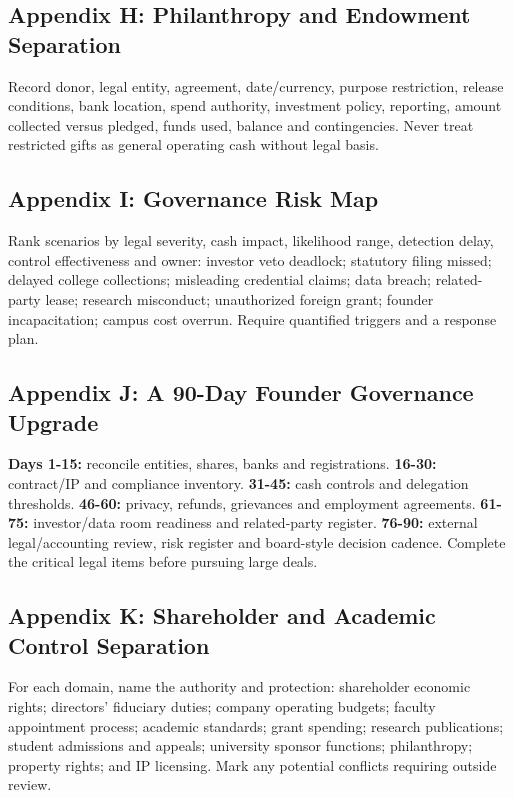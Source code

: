 \subsection{Appendix H: Philanthropy and Endowment Separation}

Record donor, legal entity, agreement, date/currency, purpose restriction, release conditions, bank location, spend authority, investment policy, reporting, amount collected versus pledged, funds used, balance and contingencies. Never treat restricted gifts as general operating cash without legal basis.

\subsection{Appendix I: Governance Risk Map}

Rank scenarios by legal severity, cash impact, likelihood range, detection delay, control effectiveness and owner: investor veto deadlock; statutory filing missed; delayed college collections; misleading credential claims; data breach; related-party lease; research misconduct; unauthorized foreign grant; founder incapacitation; campus cost overrun. Require quantified triggers and a response plan.

\subsection{Appendix J: A 90-Day Founder Governance Upgrade}

\textbf{Days 1-15:} reconcile entities, shares, banks and registrations. \textbf{16-30:} contract/IP and compliance inventory. \textbf{31-45:} cash controls and delegation thresholds. \textbf{46-60:} privacy, refunds, grievances and employment agreements. \textbf{61-75:} investor/data room readiness and related-party register. \textbf{76-90:} external legal/accounting review, risk register and board-style decision cadence. Complete the critical legal items before pursuing large deals.

\subsection{Appendix K: Shareholder and Academic Control Separation}

For each domain, name the authority and protection: shareholder economic rights; directors' fiduciary duties; company operating budgets; faculty appointment process; academic standards; grant spending; research publications; student admissions and appeals; university sponsor functions; philanthropy; property rights; and IP licensing. Mark any potential conflicts requiring outside review.

